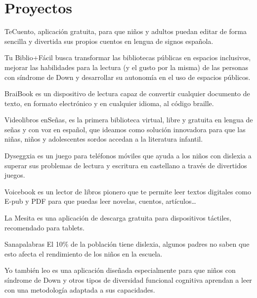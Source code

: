 \section{Proyectos}
TeCuento, aplicación gratuita, para que niños y adultos puedan editar de forma sencilla y divertida sus propios cuentos en lengua de signos española.

Tu Biblio+Fácil busca transformar las bibliotecas públicas en espacios inclusivos, mejorar las habilidades para la lectura (y el gusto por la misma) de las personas con síndrome de Down y desarrollar su autonomía en el uso de espacios públicos.


BraiBook es un dispositivo de lectura capaz de convertir cualquier documento de texto, en formato electrónico y en cualquier idioma, al código braille.


Videolibros enSeñas, es la primera biblioteca virtual, libre y gratuita en lengua de señas y con voz en español, que ideamos como solución innovadora para que las niñas, niños y adolescentes sordos accedan a la literatura infantil. 


Dyseggxia es un juego para teléfonos móviles que ayuda a los niños con dislexia a superar sus problemas de lectura y escritura en castellano a través de divertidos juegos. 


Voicebook es un lector de libros pionero que te permite leer textos digitales como E-pub y PDF para que puedas leer novelas, cuentos, artículos… 


La Mesita es una aplicación de descarga gratuita para dispositivos táctiles, recomendado para tablets. 


Sanapalabras El 10\% de la población tiene dislexia, algunos padres no saben que esto afecta el rendimiento de los niños en la escuela. 


Yo también leo es una aplicación diseñada especialmente para que niños con síndrome de Down y otros tipos de diversidad funcional cognitiva aprendan a leer con una metodología adaptada a sus capacidades.



